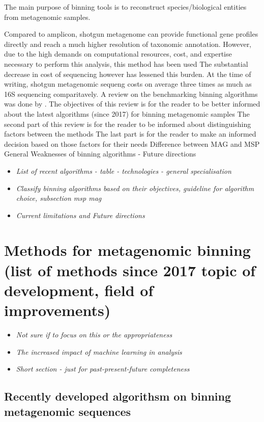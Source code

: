 \documentclass{article}
\begin{document}
The main purpose of binning tools is to reconstruct species/biological entities from metagenomic samples.  

Compared to amplicon, shotgun metagenome can provide functional gene profiles directly and reach a much higher resolution of taxonomic annotation.
However, due to the high demands on computational resources, cost, and expertise necessary to perform this analysis, this method has been used
The substantial decrease in cost of sequencing however has lessened this burden. 
At the time of writing, shotgun metagenomic sequeng costs on average three times as much as 16S sequencing comparitavely.
A review on the benchmarking binning algorithms was done by .
The objectives of this review is for the reader to be better informed about the latest algorithms (since 2017) for binning metagenomic samples
The second part of this review is for the reader to be informed about distinguishing factors between the methods
The last part is for the reader to make an informed decision based on those factors for their needs
Difference between MAG and MSP
General Weaknesses of binning algorithms - Future directions
\begin{itemize}
	\item \emph{List of recent algorithms - table - technologies - general specialisation}
	\item \emph{Classify binning algorithms based on their objectives, guideline for algorithm choice, subsection msp mag }
	\item \emph{Current limitations and Future directions}
\end{itemize}


\section{Methods for metagenomic binning (list of methods since 2017 topic of development, field of improvements) }
\begin{itemize}
	\item \emph{Not sure if to focus on this or the appropriateness}
	\item \emph{The increased impact of machine learning in analysis}
	\item \emph{Short section - just for past-present-future completeness}
\end{itemize}
\subsection{Recently developed algorithsm on binning metagenomic sequences}
\end{document}
